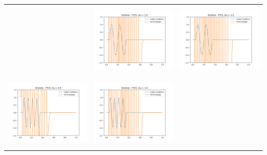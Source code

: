 \documentclass[a4paper,twoside,11pt]{article}
\begin{document}
\begin{table}[!h]
\begin{tabular}{ | c | m{5cm} | m{5cm} | }
\begin{minipage}{.3\textwidth}
        \end{minipage}
        &
        \begin{minipage}{.3\textwidth}
          \includegraphics[width=\linewidth, height=3.5cm]{../plots/scheme2-IC2-mu1_0.png}
        \end{minipage}
        &
        \begin{minipage}{.3\textwidth}
          \includegraphics[width=\linewidth, height=3.5cm]{../plots/scheme2-IC2-mu1_5.png}
        \end{minipage} \\
        \begin{minipage}{.3\textwidth}
          \includegraphics[width=\linewidth, height=3.5cm]{../plots/scheme2-IC3-mu0_5.png}
        \end{minipage}
        &
        \begin{minipage}{.3\textwidth}
          \includegraphics[width=\linewidth, height=3.5cm]{../plots/scheme2-IC3-mu1_0.png}
        \end{minipage}
        &
        \begin{minipage}{.3\textwidth}

\end{minipage}
\end{tabular}
\end{table}
\end{document}

